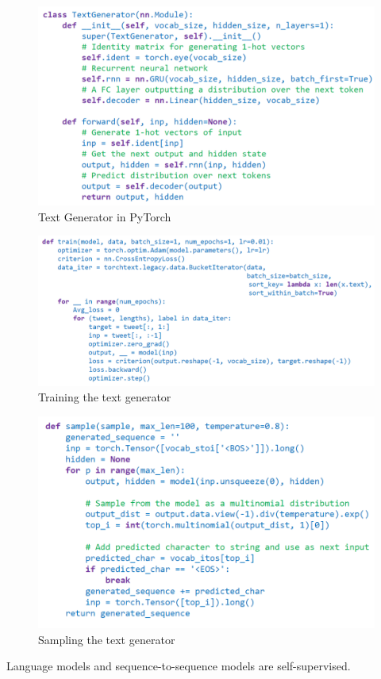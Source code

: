 \begin{figure}[h!t]
    \centering
    \includegraphics[width=0.655\linewidth]{textgen.png}
    \caption{Text Generator in PyTorch}
    \label{fig:enter-label}
\end{figure}
\begin{figure}[h!t]
    \centering
    \includegraphics[width=0.8\linewidth]{traintextgen.png}
    \caption{Training the text generator}
    \label{fig:enter-label}
\end{figure}
\begin{figure}[h!t]
    \centering
    \includegraphics[width=0.655\linewidth]{samplingtextgen.png}
    \caption{Sampling the text generator}
    \label{fig:enter-label}
\end{figure}

\begin{idea}
    Language models and sequence-to-sequence models are self-supervised.
\end{idea}

\newpage


